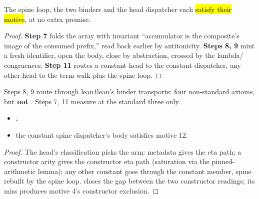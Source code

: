\begin{lemma}
\label{lem:step_visitAppArgs}
\leanok
{}
 The spine loop, the two binders and the head dispatcher each \hl{satisfy their motive},
at no extra premise.
\end{lemma}
\begin{proof}
\leanok
{}
 \textbf{Step 7} folds the array with invariant ``accumulator is the composite's image of the
consumed prefix,'' read back earlier by antitonicity. \textbf{Steps 8, 9} mint a fresh identifier, open
the body, close by abstraction, crossed by the lambda/ congruences. \textbf{Step 11} routes a
constant head to the constant dispatcher, any other head to the term walk plus the spine loop.
\end{proof}

\begin{remark}
 Steps 8, 9 route through lean4lean's binder transports: four non-standard axioms, but
\textbf{not} . Steps 7, 11 measure at the standard three only.
\end{remark}

\begin{lemma}
\label{lem:step_visitConstApp}
\leanok
{}
\begin{itemize}
\item {} ;
\item {} the constant spine dispatcher's body satisfies motive 12.
\end{itemize}
\end{lemma}
\begin{proof}
\leanok
{}
 The head's classification picks the arm:  metadata gives the 
eta path; a constructor arity gives the constructor eta path (saturation via the pinned-arithmetic
lemma); any other constant goes through the constant member, spine rebuilt by the spine loop.
 closes the gap between the two constructor readings; its miss produces motive 4's
constructor exclusion.
\end{proof}

